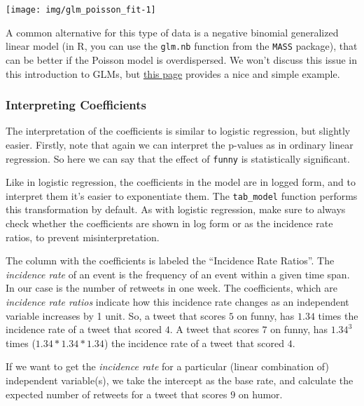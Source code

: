 \documentclass[
]{article}
\begin{document}
\begin{center}\texttt{[image: img/glm\_poisson\_fit-1]} \end{center}

A common alternative for this type of data is a negative binomial
generalized linear model (in R, you can use the \texttt{glm.nb} function
from the \texttt{MASS} package), that can be better if the Poisson model
is overdispersed. We won't discuss this issue in this introduction to
GLMs, but
\href{https://www.theanalysisfactor.com/overdispersion-in-count-models-fit-the-model-to-the-data-dont-fit-the-data-to-the-model/}{this
page} provides a nice and simple example.

\hypertarget{interpreting-coefficients}{%
\subsubsection{Interpreting
Coefficients}\label{interpreting-coefficients}}

The interpretation of the coefficients is similar to logistic
regression, but slightly easier. Firstly, note that again we can
interpret the p-values as in ordinary linear regression. So here we can
say that the effect of \texttt{funny} is statistically significant.

Like in logistic regression, the coefficients in the model are in logged
form, and to interpret them it's easier to exponentiate them. The
\texttt{tab\_model} function performs this transformation by default. As
with logistic regression, make sure to always check whether the
coefficients are shown in log form or as the incidence rate ratios, to
prevent misinterpretation.

The column with the coefficients is labeled the ``Incidence Rate
Ratios''. The \emph{incidence rate} of an event is the frequency of an
event within a given time span. In our case is the number of retweets in
one week. The coefficients, which are \emph{incidence rate ratios}
indicate how this incidence rate changes as an independent variable
increases by 1 unit. So, a tweet that scores \(5\) on funny, has
\(1.34\) times the incidence rate of a tweet that scored \(4\). A tweet
that scores \(7\) on funny, has \(1.34^3\) times
(\(1.34 * 1.34 * 1.34\)) the incidence rate of a tweet that scored
\(4\).

If we want to get the \emph{incidence rate} for a particular (linear
combination of) independent variable(s), we take the intercept as the
base rate, and calculate the expected number of retweets for a tweet
that scores \(9\) on humor.
\end{document}
